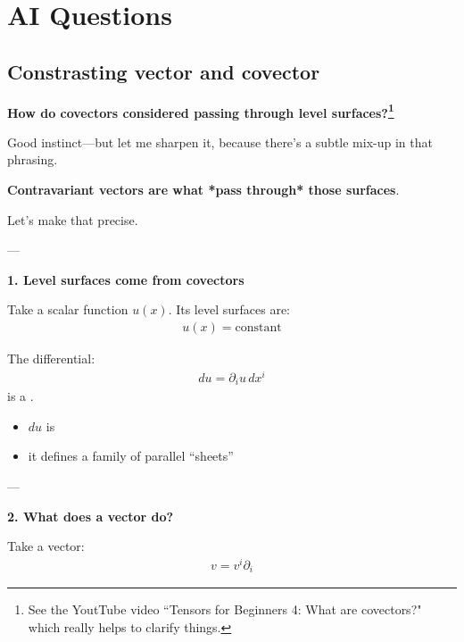\documentclass[12pt,a4paper]{report}
\begin{document}
\newpage
\section*{AI Questions}

\begin{description}

\subsection*{Constrasting vector and covector}

\item \textbf{How do covectors considered passing through level surfaces?\footnote{See the YoutTube video ``Tensors for Beginners 4: What are covectors?" which really helps to clarify things.}}

Good instinct—but let me sharpen it, because there’s a subtle mix-up in that phrasing.


\textbf{Contravariant vectors are what *pass through* those surfaces}.

Let’s make that precise.

---

\begin{description}
\item \textbf{1. Level surfaces come from covectors}

Take a scalar function $u(x)$. Its level surfaces are:
\begin{align*}
u(x) = \text{constant}
\end{align*}

The differential:
\begin{align*}
du = \partial_i u \, dx^i
\end{align*}
is a .


\begin{itemize}
\item $du$ is 
\item it defines a family of parallel “sheets”
\end{itemize}

---

\item \textbf{2. What does a vector do?}

Take a vector:
\begin{align*}
v = v^i \partial_i
\end{align*}


\end{description}
\end{description}
\end{document}
